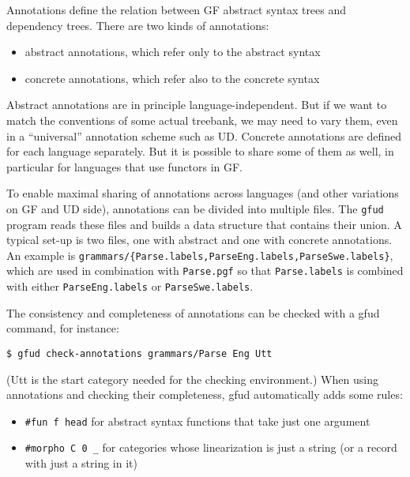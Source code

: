 
Annotations define the relation between GF abstract syntax trees and
dependency trees. There are two kinds of annotations:

\begin{itemize}
\item
  abstract annotations, which refer only to the abstract syntax
\item
  concrete annotations, which refer also to the concrete syntax
\end{itemize}

Abstract annotations are in principle language-independent. But if we
want to match the conventions of some actual treebank, we may need to
vary them, even in a ``universal'' annotation scheme such as UD.
Concrete annotations are defined for each language separately. But it is
possible to share some of them as well, in particular for languages that
use functors in GF.

To enable maximal sharing of annotations across languages (and other
variations on GF and UD side), annotations can be divided into multiple
files. The \texttt{gfud} program reads these files and builds a data
structure that contains their union. A typical set-up is two files, one
with abstract and one with concrete annotations. An example is
\texttt{grammars/\{Parse.labels,ParseEng.labels,ParseSwe.labels\}},
which are used in combination with \texttt{Parse.pgf} so that
\texttt{Parse.labels} is combined with either \texttt{ParseEng.labels}
or \texttt{ParseSwe.labels}.

The consistency and completeness of annotations can be checked with a
gfud command, for instance:

\begin{verbatim}
$ gfud check-annotations grammars/Parse Eng Utt
\end{verbatim}

(Utt is the start category needed for the checking environment.) When
using annotations and checking their completeness, gfud automatically
adds some rules:

\begin{itemize}
\item
  \texttt{\#fun\ f\ head} for abstract syntax functions that take just
  one argument
\item
  \texttt{\#morpho\ C\ 0\ \_} for categories whose linearization is just
  a string (or a record with just a string in it)
\end{itemize}


